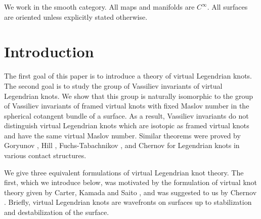 We work in the smooth category.  All maps and manifolds are $C^\infty$. All surfaces are oriented unless explicitly stated otherwise.

\section{Introduction}

  The first goal of this paper is to introduce a theory of virtual Legendrian knots.  The second goal is to study the group of Vassiliev invariants of virtual Legendrian knots.  We show that this group is naturally isomorphic to the group of Vassiliev invariants of framed virtual knots with fixed Maslov number in the spherical cotangent bundle of a surface.  As a result, Vassiliev invariants do not distinguish virtual Legendrian knots which are isotopic as framed virtual knots and have the same virtual Maslov number.  Similar theorems were proved by Goryunov \cite{Goryunov}, Hill \cite{Hill}, Fuchs-Tabachnikov \cite{f&t}, and Chernov \cite{Chernov} for Legendrian knots in various contact structures. 



We give three equivalent formulations of virtual Legendrian knot theory.  The first, which we introduce below, was motivated by the formulation of virtual knot theory given by Carter, Kamada and Saito \cite{CKS}, and was suggested to us by Chernov \cite{ChernovDefn}. Briefly, virtual Legendrian knots are wavefronts on surfaces up to stabilization and destabilization of the surface.

